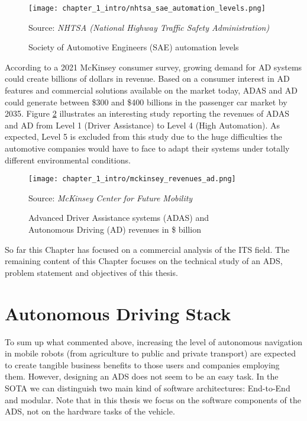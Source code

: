 \begin{figure}[h]
	\centering
	\texttt{[image: chapter\_1\_intro/nhtsa\_sae\_automation\_levels.png]}
	\caption{Society of Automotive Engineers (SAE) automation levels}
    Source: \textit{NHTSA (National Highway Traffic Safety Administration)}
	\label{fig:chapter_1_intro/nhtsa_sae_automation_levels}
\end{figure}


According to a 2021 McKinsey consumer survey, growing demand for \ac{AD} systems could create billions of dollars in revenue. Based on a consumer interest in \ac{AD} features and commercial solutions available on the market today, ADAS and AD could generate between \$300 and \$400 billions in the passenger car market by 2035. Figure \ref{fig:chapter_1_intro/mckinsey_revenues_ad} illustrates an interesting study reporting the revenues of \ac{ADAS} and \ac{AD}  from Level 1 (Driver Assistance) to Level 4 (High Automation). As expected, Level 5 is excluded from this study due to the huge difficulties the automotive companies would have to face to adapt their systems under totally different environmental conditions.

\begin{figure}[h]
	\centering
	\texttt{[image: chapter\_1\_intro/mckinsey\_revenues\_ad.png]}
	\caption{Advanced Driver Assistance systems (ADAS) and \\ Autonomous Driving (AD) revenues in \$ billion} Source: \textit{McKinsey Center for Future Mobility}
	\label{fig:chapter_1_intro/mckinsey_revenues_ad}
\end{figure}

So far this Chapter has focused on a commercial analysis of the \ac{ITS} field. The remaining content of this Chapter focuses on the technical study of an \ac{ADS}, problem statement and objectives of this thesis.

\section{Autonomous Driving Stack}
\label{sec:1_ad_architecture}

To sum up what commented above, increasing the level of autonomous navigation in mobile robots (from agriculture to public and private transport) are expected to create tangible business benefits to those users and companies employing them. However, designing an \ac{ADS} does not seem to be an easy task. In the \ac{SOTA} we can distinguish two main kind of software architectures: End-to-End and modular. Note that in this thesis we focus on the software components of the \ac{ADS}, not on the hardware tasks of the vehicle. 

